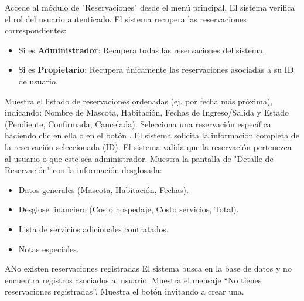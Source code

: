 \begin{UCtrayectoria}
    \UCpaso[\UCactor] Accede al módulo de "Reservaciones" desde el menú principal.
    \UCpaso El sistema verifica el rol del usuario autenticado.
    \UCpaso El sistema recupera las reservaciones correspondientes:
        \begin{itemize}
            \item Si es \textbf{Administrador}: Recupera todas las reservaciones del sistema.
            \item Si es \textbf{Propietario}: Recupera únicamente las reservaciones asociadas a su ID de usuario.
        \end{itemize}
    \UCpaso Muestra el listado de reservaciones ordenadas (ej. por fecha más próxima), indicando: Nombre de Mascota, Habitación, Fechas de Ingreso/Salida y Estado (Pendiente, Confirmada, Cancelada).
    \UCpaso[\UCactor] Selecciona una reservación específica haciendo clic en ella o en el botón .
    \UCpaso El sistema solicita la información completa de la reservación seleccionada (ID).
    \UCpaso El sistema valida que la reservación pertenezca al usuario o que este sea administrador.
    \UCpaso Muestra la pantalla de "Detalle de Reservación" con la información desglosada:
        \begin{itemize}
            \item Datos generales (Mascota, Habitación, Fechas).
            \item Desglose financiero (Costo hospedaje, Costo servicios, Total).
            \item Lista de servicios adicionales contratados.
            \item Notas especiales.
        \end{itemize}
\end{UCtrayectoria}


\begin{UCtrayectoriaA}{A}{No existen reservaciones registradas}
    \UCpaso El sistema busca en la base de datos y no encuentra registros asociados al usuario.
    \UCpaso Muestra el mensaje ``No tienes reservaciones registradas''.
    \UCpaso Muestra el botón  invitando a crear una.
\end{UCtrayectoriaA}

